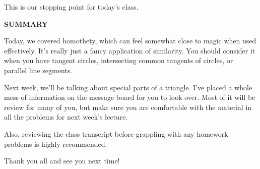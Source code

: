 


This is our stopping point for today's class.

\textbf{SUMMARY}

Today, we covered homothety, which can feel somewhat close to magic when used effectively. It's really just a fancy application of similarity. You should consider it when you have tangent circles, intersecting common tangents of circles, or parallel line segments.

Next week, we'll be talking about special parts of a triangle. I've placed a whole mess of information on the message board for you to look over. Most of it will be review for many of you, but make sure you are comfortable with the material in all the problems for next week's lecture.

Also, reviewing the class transcript before grappling with any homework problems is highly recommended.

Thank you all and see you next time! 


